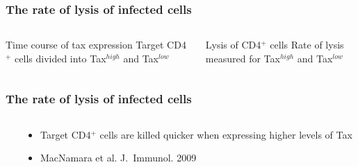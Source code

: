 \documentclass[slidescentered,compress]{beamer}
\begin{document}
\frame
{
\frametitle{The rate of lysis of infected cells}

\begin{columns}[c]

\begin{column}{5cm}
\begin{block}{Time course of tax expression}
Target CD4$^+$ cells divided into Tax$^{high}$ and Tax$^{low}$ 
\end{block}

\begin{figure}
\end{figure}


\end{column}

\pause

\begin{column}{5cm}

\begin{block}{Lysis of CD4$^+$ cells}
Rate of lysis measured for Tax$^{high}$ and Tax$^{low}$
\end{block}

\begin{figure}
\end{figure}

\end{column}

\end{columns}

}

\frame
{
\frametitle{The rate of lysis of infected cells}

\begin{columns}[c]

\begin{column}{5cm}
\end{column}

\begin{column}{5cm}
\begin{itemize}
\item Target CD4$^+$ cells are killed quicker when expressing higher levels of Tax
\item MacNamara et al. J.~Immunol. 2009
\end{itemize}
\end{column}

\end{columns}
}
\end{document}
